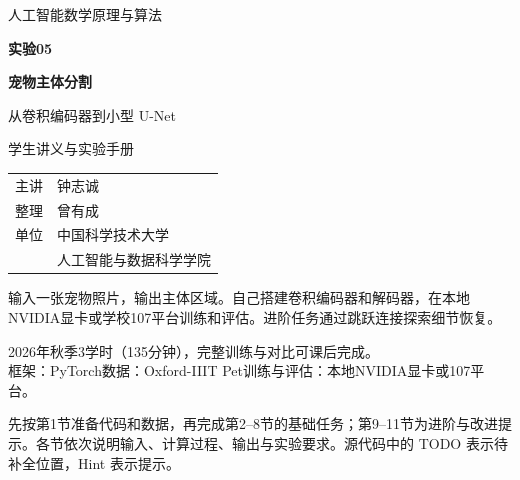 \documentclass[UTF8,a4paper,11pt,fontset=fandol]{ctexart}
\begin{document}
\hypersetup{pageanchor=false}
\begin{titlepage}
\thispagestyle{empty}
\vspace*{1.0cm}
{\Large\color{white}人工智能数学原理与算法\par}
\vspace{1.0cm}
{\fontsize{34}{43}\selectfont\bfseries\color{white}实验05\par}
\vspace{.4cm}
{\fontsize{26}{34}\selectfont\bfseries\color{white}宠物主体分割\par}
\vspace{.3cm}
{\Large\color{white}从卷积编码器到小型 U-Net\par}
\vspace{.8cm}
{\large\color{Navy}学生讲义与实验手册\par}
\vspace{2.1cm}
\begin{tabular}{@{}ll}
主讲 & 钟志诚\\[.6em]
整理 & 曾有成\\[.6em]
单位 & 中国科学技术大学\\
 & 人工智能与数据科学学院
\end{tabular}
\vspace{1cm}
\begin{keybox}[本次实验要完成的作品]
输入一张宠物照片，输出主体区域。自己搭建卷积编码器和解码器，在本地NVIDIA显卡或学校107平台训练和评估。进阶任务通过跳跃连接探索细节恢复。
\end{keybox}
\vfill
2026年秋季\quad 3学时（135分钟），完整训练与对比可课后完成。\\
框架：PyTorch\quad 数据：Oxford-IIIT Pet\quad 训练与评估：本地NVIDIA显卡或107平台。
\end{titlepage}
\hypersetup{pageanchor=true}
\tableofcontents
\vfill
\begin{teacherbox}[阅读顺序]
先按第1节准备代码和数据，再完成第2--8节的基础任务；第9--11节为进阶与改进提示。各节依次说明输入、计算过程、输出与实验要求。源代码中的 TODO 表示待补全位置，Hint 表示提示。
\end{teacherbox}
\clearpage{}
\end{document}
